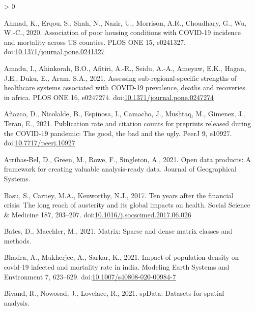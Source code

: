 \documentclass[]{elsarticle} %
\newlength{\cslhangindent}
\newenvironment{CSLReferences}[2] %
 {%
  \setlength{\parindent}{0pt}
  \ifodd #1 \everypar{\setlength{\hangindent}{\cslhangindent}}\ignorespaces\fi
  \ifnum #2 > 0
  \setlength{\parskip}{#2\baselineskip}
  \fi
 }%
 {}
\begin{document}
\hypertarget{refs}{}
\begin{CSLReferences}{1}{0}
\leavevmode\hypertarget{ref-Ahmad2020association}{}%
Ahmad, K., Erqou, S., Shah, N., Nazir, U., Morrison, A.R., Choudhary,
G., Wu, W.-C., 2020. Association of poor housing conditions with
COVID-19 incidence and mortality across US counties. PLOS ONE 15,
e0241327.
doi:\href{https://doi.org/10.1371/journal.pone.0241327}{10.1371/journal.pone.0241327}

\leavevmode\hypertarget{ref-Amadu2021assessing}{}%
Amadu, I., Ahinkorah, B.O., Afitiri, A.-R., Seidu, A.-A., Ameyaw, E.K.,
Hagan, J.E., Duku, E., Aram, S.A., 2021. Assessing sub-regional-specific
strengths of healthcare systems associated with COVID-19 prevalence,
deaths and recoveries in africa. PLOS ONE 16, e0247274.
doi:\href{https://doi.org/10.1371/journal.pone.0247274}{10.1371/journal.pone.0247274}

\leavevmode\hypertarget{ref-Anazco2021publication}{}%
Añazco, D., Nicolalde, B., Espinosa, I., Camacho, J., Mushtaq, M.,
Gimenez, J., Teran, E., 2021. Publication rate and citation counts for
preprints released during the COVID-19 pandemic: The good, the bad and
the ugly. PeerJ 9, e10927.
doi:\href{https://doi.org/10.7717/peerj.10927}{10.7717/peerj.10927}

\leavevmode\hypertarget{ref-Arribas2021open}{}%
Arribas-Bel, D., Green, M., Rowe, F., Singleton, A., 2021. Open data
products: A framework for creating valuable analysis-ready data. Journal
of Geographical Systems.

\leavevmode\hypertarget{ref-Basu2017ten}{}%
Basu, S., Carney, M.A., Kenworthy, N.J., 2017. Ten years after the
financial crisis: The long reach of austerity and its global impacts on
health. Social Science \& Medicine 187, 203--207.
doi:\href{https://doi.org/10.1016/j.socscimed.2017.06.026}{10.1016/j.socscimed.2017.06.026}

\leavevmode\hypertarget{ref-R-Matrix}{}%
Bates, D., Maechler, M., 2021. Matrix: Sparse and dense matrix classes
and methods.

\leavevmode\hypertarget{ref-Bhadra2021impact}{}%
Bhadra, A., Mukherjee, A., Sarkar, K., 2021. Impact of population
density on covid-19 infected and mortality rate in india. Modeling Earth
Systems and Environment 7, 623--629.
doi:\href{https://doi.org/10.1007/s40808-020-00984-7}{10.1007/s40808-020-00984-7}

\leavevmode\hypertarget{ref-R-spData}{}%
Bivand, R., Nowosad, J., Lovelace, R., 2021. spData: Datasets for
spatial analysis.


\end{CSLReferences}
\end{document}
